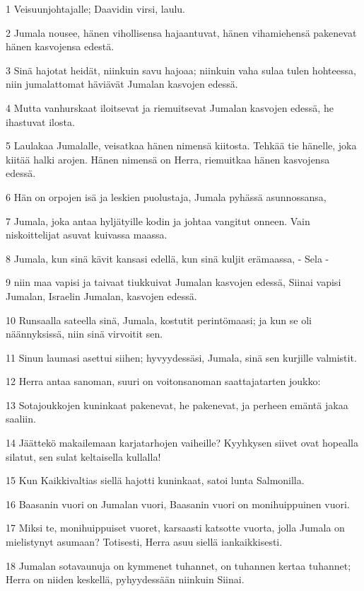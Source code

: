 \par 1 Veisuunjohtajalle; Daavidin virsi, laulu.
\par 2 Jumala nousee, hänen vihollisensa hajaantuvat, hänen vihamiehensä pakenevat hänen kasvojensa edestä.
\par 3 Sinä hajotat heidät, niinkuin savu hajoaa; niinkuin vaha sulaa tulen hohteessa, niin jumalattomat häviävät Jumalan kasvojen edessä.
\par 4 Mutta vanhurskaat iloitsevat ja riemuitsevat Jumalan kasvojen edessä, he ihastuvat ilosta.
\par 5 Laulakaa Jumalalle, veisatkaa hänen nimensä kiitosta. Tehkää tie hänelle, joka kiitää halki arojen. Hänen nimensä on Herra, riemuitkaa hänen kasvojensa edessä.
\par 6 Hän on orpojen isä ja leskien puolustaja, Jumala pyhässä asunnossansa,
\par 7 Jumala, joka antaa hyljätyille kodin ja johtaa vangitut onneen. Vain niskoittelijat asuvat kuivassa maassa.
\par 8 Jumala, kun sinä kävit kansasi edellä, kun sinä kuljit erämaassa, - Sela -
\par 9 niin maa vapisi ja taivaat tiukkuivat Jumalan kasvojen edessä, Siinai vapisi Jumalan, Israelin Jumalan, kasvojen edessä.
\par 10 Runsaalla sateella sinä, Jumala, kostutit perintömaasi; ja kun se oli näännyksissä, niin sinä virvoitit sen.
\par 11 Sinun laumasi asettui siihen; hyvyydessäsi, Jumala, sinä sen kurjille valmistit.
\par 12 Herra antaa sanoman, suuri on voitonsanoman saattajatarten joukko:
\par 13 Sotajoukkojen kuninkaat pakenevat, he pakenevat, ja perheen emäntä jakaa saaliin.
\par 14 Jäättekö makailemaan karjatarhojen vaiheille? Kyyhkysen siivet ovat hopealla silatut, sen sulat keltaisella kullalla!
\par 15 Kun Kaikkivaltias siellä hajotti kuninkaat, satoi lunta Salmonilla.
\par 16 Baasanin vuori on Jumalan vuori, Baasanin vuori on monihuippuinen vuori.
\par 17 Miksi te, monihuippuiset vuoret, karsaasti katsotte vuorta, jolla Jumala on mielistynyt asumaan? Totisesti, Herra asuu siellä iankaikkisesti.
\par 18 Jumalan sotavaunuja on kymmenet tuhannet, on tuhannen kertaa tuhannet; Herra on niiden keskellä, pyhyydessään niinkuin Siinai.
